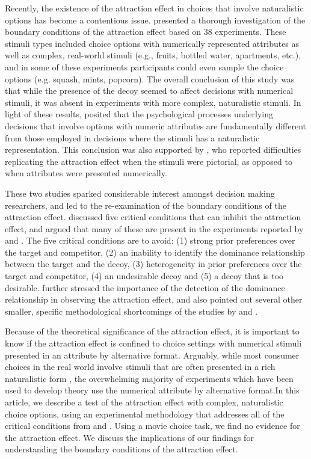 \documentclass[12pt, a4paper]{article}
\begin{document}
Recently, the existence of the attraction effect in choices that involve naturalistic options has become a contentious issue.
 presented a thorough investigation of the boundary conditions of the attraction effect based on 38 experiments. These stimuli types included choice options with numerically represented attributes as well as complex, real-world stimuli (e.g., fruits, bottled water, apartments, etc.), and in some of these experiments participants could even sample the choice options (e.g. squash, mints, popcorn). The overall conclusion of this study was that while the presence of the decoy seemed to affect decisions with numerical stimuli, it was absent in experiments with more complex, naturalistic stimuli. In light of these results, \citeauthor{Frederick2014} posited that the psychological processes underlying decisions that involve options with numeric attributes are fundamentally different from those employed in decisions where the stimuli has a naturalistic representation. This conclusion was also supported by , who reported difficulties replicating the attraction effect when the stimuli were pictorial, as opposed to when attributes were presented numerically.

These two studies sparked considerable interest amongst decision making researchers, and led to the re-examination of the boundary conditions of the attraction effect.  discussed five critical conditions that can inhibit the attraction effect, and argued that many of these are present in the experiments reported by \citeauthor{Frederick2014} and \citeauthor{Yang2014}. The five critical conditions are to avoid: (1) strong prior preferences over the target and competitor, (2) an inability to identify the dominance relationship  between the target and the decoy, (3) heterogeneity in prior preferences over the target and competitor, (4) an undesirable decoy and (5) a decoy that is too desirable.  further stressed the importance of the detection of the dominance relationship in observing the attraction effect, and also pointed out several other smaller, specific methodological shortcomings of the studies by \citeauthor{Frederick2014} and \citeauthor{Yang2014}.

Because of the theoretical significance of the attraction effect, it is important to know if the attraction effect is confined to choice settings with numerical stimuli presented in an attribute by alternative format. Arguably, while most consumer choices in the real world involve stimuli that are often presented in a rich naturalistic form \cite{Bhatia2018b}, the overwhelming majority of experiments which have been used to develop theory use the numerical attribute by alternative format.In this article, we describe a test of the attraction effect with complex, naturalistic choice options, using an experimental methodology that addresses all of the critical conditions from \citeauthor{Frederick2014} and \citeauthor{Yang2014}. Using a movie choice task, we find no evidence for the attraction effect. We discuss the implications of our findings for understanding the boundary conditions of the attraction effect.
\end{document}
